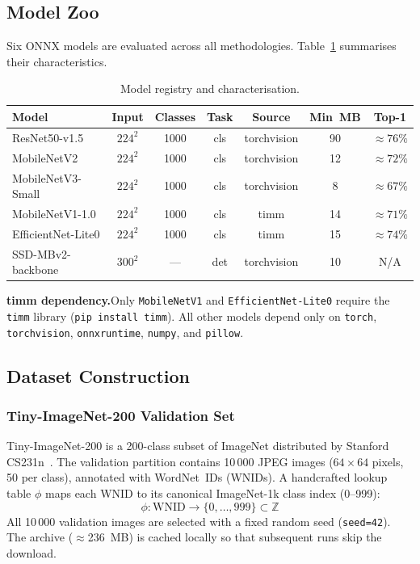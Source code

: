 \subsection{Model Zoo}

Six ONNX models are evaluated across all methodologies.
Table~\ref{tab:model_zoo} summarises their characteristics.

\begin{table}[H]
\centering
\caption{Model registry and characterisation.}
\label{tab:model_zoo}
\begin{tabular}{lcccccc}
\toprule
\textbf{Model} & \textbf{Input} & \textbf{Classes} & \textbf{Task}
    & \textbf{Source} & \textbf{Min~MB} & \textbf{Top-1} \\
\midrule
ResNet50-v1.5       & $224^2$ & 1000 & cls & torchvision & 90  & $\approx76\%$ \\
MobileNetV2         & $224^2$ & 1000 & cls & torchvision & 12  & $\approx72\%$ \\
MobileNetV3-Small   & $224^2$ & 1000 & cls & torchvision &  8  & $\approx67\%$ \\
MobileNetV1-1.0     & $224^2$ & 1000 & cls & timm        & 14  & $\approx71\%$ \\
EfficientNet-Lite0  & $224^2$ & 1000 & cls & timm        & 15  & $\approx74\%$ \\
SSD-MBv2-backbone   & $300^2$ &  --- & det & torchvision & 10  & N/A \\
\bottomrule
\end{tabular}
\end{table}

\noindent\textbf{timm dependency.}\quad Only \texttt{MobileNetV1} and
\texttt{EfficientNet-Lite0} require the \texttt{timm} library
(\texttt{pip install timm}). All other models depend only on \texttt{torch},
\texttt{torchvision}, \texttt{onnxruntime}, \texttt{numpy}, and
\texttt{pillow}.

\subsection{Dataset Construction}

\subsubsection{Tiny-ImageNet-200 Validation Set}

Tiny-ImageNet-200 is a 200-class subset of ImageNet distributed by Stanford
CS231n~\cite{ref:tiny-imagenet}. The validation partition contains 10\,000
JPEG images ($64\times64$ pixels, 50 per class), annotated with WordNet~IDs
(WNIDs). A handcrafted lookup table $\phi$ maps each WNID to its canonical
ImageNet-1k class index (0--999):
\begin{equation}
    \phi : \text{WNID} \rightarrow \{0, \ldots, 999\} \subset \mathbb{Z}
    \label{eq:wnid}
\end{equation}
All 10\,000 validation images are selected with a fixed random seed
(\texttt{seed=42}). The archive ($\approx$236~MB) is cached locally so that
subsequent runs skip the download.

